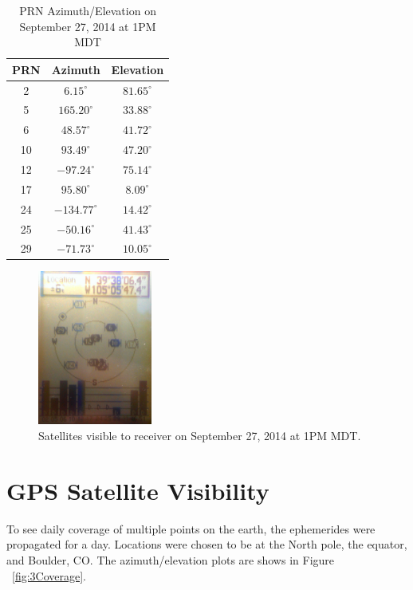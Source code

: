 \documentclass[paper]{aiaaNew}
\begin{document}
\begin{table}[tbh]
\centering

\begin{tabular}{|c|c|c|}  
\hline
PRN & Azimuth & Elevation\\
\hline\hline
2 & $6.15^{\circ}$ & $81.65^{\circ}$\\  
\hline
5 & $165.20^{\circ}$ & $33.88^{\circ}$\\
\hline
6 & $48.57^{\circ}$ & $41.72^{\circ}$\\
\hline
10 & $93.49^{\circ}$ & $47.20^{\circ}$\\
\hline
12 & $-97.24^{\circ}$ & $75.14^{\circ}$\\
\hline
17 & $95.80^{\circ}$ & $8.09^{\circ}$\\
\hline
24 & $-134.77^{\circ}$ & $14.42^{\circ}$\\
\hline
25 & $-50.16^{\circ}$ & $41.43^{\circ}$\\
\hline
29 & $-71.73^{\circ}$ & $10.05^{\circ}$\\
\hline
\end{tabular}

\caption{PRN Azimuth/Elevation on September 27, 2014 at 1PM MDT}
\label{PRNAzEl}
\end{table}

 \begin{figure}[H]
 	\centering
 	\includegraphics[height=2in]{Figures/sept271300}
 	\caption{Satellites visible to receiver on September 27, 2014 at 1PM MDT.}
 	\label{fig:Receiver_sept271300}
 \end{figure}

\pagebreak
\section{GPS Satellite Visibility}
To see daily coverage of multiple points on the earth, the ephemerides were propagated for a day.  Locations were chosen to be at the North pole, the equator, and Boulder, CO.  The azimuth/elevation plots are shows in Figure ~\ref{fig:3Coverage}.
\end{document}
